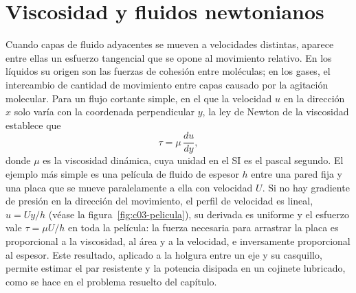 \documentclass[10pt,openany]{book}
\begin{document}
\section{Viscosidad y fluidos newtonianos}

Cuando capas de fluido adyacentes se mueven a velocidades distintas, aparece entre ellas un esfuerzo tangencial que se opone al movimiento relativo. En los líquidos su origen son las fuerzas de cohesión entre moléculas; en los gases, el intercambio de cantidad de movimiento entre capas causado por la agitación molecular. Para un flujo cortante simple, en el que la velocidad \(u\) en la dirección \(x\) solo varía con la coordenada perpendicular \(y\), la ley de Newton de la viscosidad establece que
\begin{equation}
\tau = \mu\,\frac{du}{dy}, \label{eq:c03-newton}
\end{equation}
donde \(\mu\) es la viscosidad dinámica, cuya unidad en el SI es el pascal segundo. El ejemplo más simple es una película de fluido de espesor \(h\) entre una pared fija y una placa que se mueve paralelamente a ella con velocidad \(U\). Si no hay gradiente de presión en la dirección del movimiento, el perfil de velocidad es lineal, \(u = Uy/h\) (véase la figura~\ref{fig:c03-pelicula}), su derivada es uniforme y el esfuerzo vale \(\tau = \mu U/h\) en toda la película: la fuerza necesaria para arrastrar la placa es proporcional a la viscosidad, al área y a la velocidad, e inversamente proporcional al espesor. Este resultado, aplicado a la holgura entre un eje y su casquillo, permite estimar el par resistente y la potencia disipada en un cojinete lubricado, como se hace en el problema resuelto del capítulo.
\end{document}

